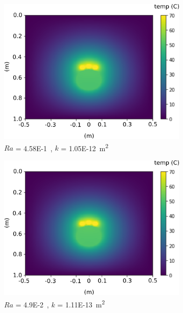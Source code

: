 \documentclass[Journal,letterpaper,InsideFigs]{ascelike-new}
\begin{document}
\begin{figure}[ht]\ContinuedFloat 
 \begin{subfigure}[b]{0.49\textwidth}
    \includegraphics[width=\textwidth]{figs/ra/0p45.png}
    \caption{$Ra$ = \SI{4.58E-1}, $k$ = \SI{1.05E-12}{\meter\squared}}
 \end{subfigure}
 \begin{subfigure}[b]{0.49\textwidth}
    \includegraphics[width=\textwidth]{figs/ra/0p049.png}
    \caption{$Ra$ = \SI{4.9E-2}, $k$ = \SI{1.11E-13}{\meter\squared}}
 \end{subfigure}\\    
 \begin{subfigure}[b]{0.49\textwidth}

\end{subfigure}
\end{figure}
\end{document}
